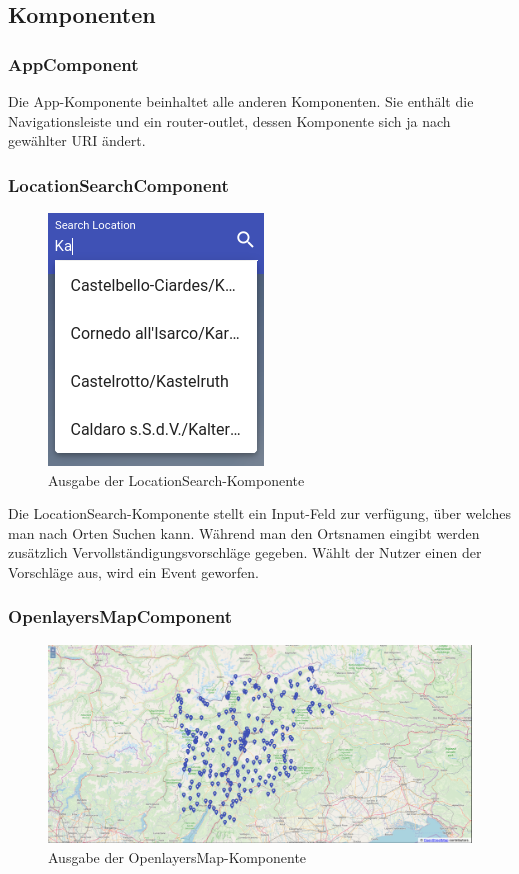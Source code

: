 \documentclass[a4paper,12pt]{article}
\begin{document}
\subsection{Komponenten}
\subsubsection{AppComponent}
Die App-Komponente beinhaltet alle anderen Komponenten. Sie enthält die
Navigationsleiste und ein router-outlet, dessen Komponente sich ja nach
gewählter URI ändert.

\subsubsection{LocationSearchComponent}
\begin{figure}[H]
    \centering
    \includegraphics[width=0.2\linewidth]{assets/location-search.png}
    \caption{Ausgabe der LocationSearch-Komponente}
    \label{fig:location-search}
\end{figure}

Die LocationSearch-Komponente stellt ein Input-Feld zur verfügung, über welches
man nach Orten Suchen kann. Während man den Ortsnamen eingibt werden zusätzlich
Vervollständigungsvorschläge gegeben. Wählt der Nutzer einen der Vorschläge aus,
wird ein Event geworfen.

\subsubsection{OpenlayersMapComponent}
\begin{figure}[H]
    \centering
    \includegraphics[width=0.9\linewidth]{assets/openlayers-map.png}
    \caption{Ausgabe der OpenlayersMap-Komponente}
    \label{fig:olenlayers-map}
\end{figure}
\end{document}
